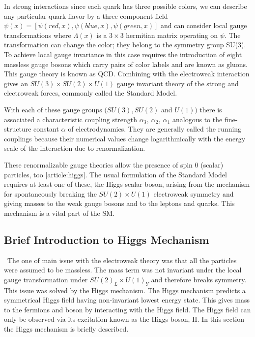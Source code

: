 
In strong interactions since each quark has three possible colors, we can describe any particular quark flavor by a three-component field $\psi(x)=[\psi(red,x),\psi(blue,x),\psi(green,x)]$ and can consider local gauge transformations where $\Lambda(x)$ is a $3\times 3$ hermitian matrix operating on $\psi$. The transformation can change the color; they belong to the symmetry group SU(3). To achieve local gauge invariance in this case requires the introduction of eight massless gauge bosons which carry pairs of color labels and are known as gluons. This gauge theory is known as QCD. Combining with the electroweak interaction gives an $SU(3)\times SU(2) \times U(1)$ gauge invariant theory of the strong and electroweak forces, commonly called the Standard Model.

With each of these gauge groups $(SU(3),SU(2)$ and $U(1))$ there is associated a characteristic coupling strength $\alpha_3,~\alpha_2,~\alpha_1$ analogous to the fine-structure constant $\alpha$ of electrodynamics. They are generally called the running couplings because their numerical values change logarithmically with the energy scale of the interaction due to renormalization.

These renormalizable gauge theories allow the presence of spin 0 (scalar) particles, too [article:higgs]. The usual formulation of the Standard Model requires at least one of these, the Higgs scalar boson, arising from the mechanism for spontaneously breaking the $SU(2)\times U(1)$ electroweak symmetry and giving masses to the weak gauge bosons and to the leptons and quarks. This mechanism is a vital part of the SM.

\subsection{Brief Introduction to Higgs Mechanism} %
\label{sub:brief_introduction_to_higgs_mechanism}\
The one of main issue with the electroweak theory was that all the particles were assumed to be massless.
The mass term was not invariant under the local gauge transformation under $SU(2)_L \times U(1)_Y$ and therefore breaks symmetry.
This issue was solved by the Higgs mechanism.
The Higgs mechanism predicts a symmetrical Higgs field having non-invariant lowest energy state. This gives mass to the fermions and boson by interacting with the Higgs field. The Higgs field can only be observed via its excitation known as the Higgs boson, H. In this section the Higgs mechanism is briefly described.


